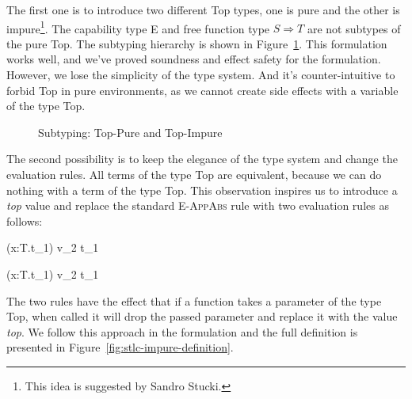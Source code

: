 The first one is to introduce two different Top types, one is pure and
the other is impure\footnote{This idea is suggested by Sandro
  Stucki.}. The capability type E and free function type
$S \Rightarrow T$ are not subtypes of the pure Top. The subtyping
hierarchy is shown in
Figure~\ref{fig:stlc-impure-subtyping-tree}. This formulation works
well, and we've proved soundness and effect safety for the
formulation. However, we lose the simplicity of the type system. And
it's counter-intuitive to forbid Top in pure environments, as we
cannot create side effects with a variable of the type Top.

\begin{figure}
\centering


\caption{Subtyping: Top-Pure and Top-Impure}
\label{fig:stlc-impure-subtyping-tree}
\end{figure}

The second possibility is to keep the elegance of the type system and
change the evaluation rules. All terms of the type Top are equivalent,
because we can do nothing with a term of the type Top. This
observation inspires us to introduce a \emph{top} value and replace
the standard \textsc{E-AppAbs} rule with two evaluation rules as
follows:

{ (\lambda x:T.t_1) v_2 \longrightarrow [x \mapsto v_2]t_1 }

{ (\lambda x:T.t_1) v_2 t_1 }

The two rules have the effect that if a function takes a parameter of
the type Top, when called it will drop the passed parameter and
replace it with the value \emph{top}. We follow this approach in the
formulation and the full definition is presented in
Figure~\ref{fig:stlc-impure-definition}.

